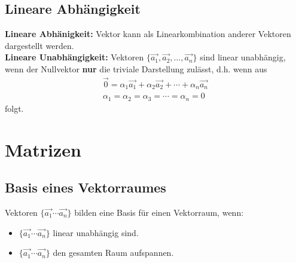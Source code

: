 \subsection{Lineare Abh\"angigkeit}
\textbf{Lineare Abh\"anigkeit:} Vektor kann als Linearkombination anderer Vektoren dargestellt werden. \\
\textbf{Lineare Unabh\"angigkeit: } Vektoren $\{\vec{a_1}, \vec{a_2}, \ldots, \vec{a_n}\}$ sind
linear unabh\"angig, wenn der Nullvektor \textbf{nur} die triviale Darstellung zul\"asst, d.h. wenn aus
\begin{gather*}
\vec{0} = \alpha_1\vec{a_1}+\alpha_2\vec{a_2}+ \cdots +\alpha_n\vec{a_n} \\
\alpha_1 = \alpha_2 = \alpha_3 = \cdots = \alpha_n = 0
\end{gather*}
folgt.

\section{Matrizen}

\subsection{Basis eines Vektorraumes}
Vektoren $\{\vec{a_1} \cdots \vec{a_n}\}$ bilden eine Basis f\"ur einen Vektorraum,
wenn:
\begin{itemize}
  \item $\{\vec{a_1} \cdots \vec{a_n}\}$ linear unabh\"angig sind.
  \item $\{\vec{a_1} \cdots \vec{a_n}\}$ den gesamten Raum aufspannen.
\end{itemize}


